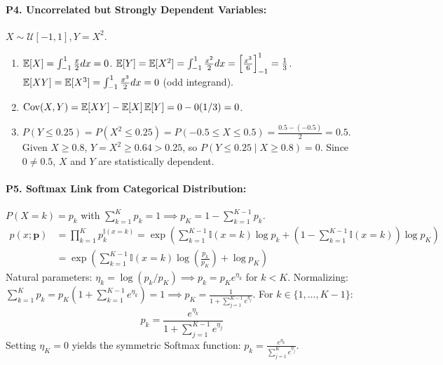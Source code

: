 \paragraph{P4. Uncorrelated but Strongly Dependent Variables:}
$X \sim \mathcal{U}[-1, 1], Y = X^2$.
\begin{enumerate}[label=(\alph*)]
    \item $\operatorname{\mathbb{E}}[X] = \int_{-1}^1 \frac{x}{2}dx = 0$.
    $\operatorname{\mathbb{E}}[Y] = \operatorname{\mathbb{E}}[X^2] = \int_{-1}^1 \frac{x^2}{2}dx = \left[\frac{x^3}{6}\right]_{-1}^1 = \frac{1}{3}$.
    $\operatorname{\mathbb{E}}[XY] = \operatorname{\mathbb{E}}[X^3] = \int_{-1}^1 \frac{x^3}{2}dx = 0$ (odd integrand).
    \item $\operatorname{Cov}(X, Y) = \operatorname{\mathbb{E}}[XY] - \operatorname{\mathbb{E}}[X]\operatorname{\mathbb{E}}[Y] = 0 - 0(1/3) = 0$.
    \item $P(Y \le 0.25) = P(X^2 \le 0.25) = P(-0.5 \le X \le 0.5) = \frac{0.5 - (-0.5)}{2} = 0.5$.
    Given $X \ge 0.8$, $Y = X^2 \ge 0.64 > 0.25$, so $P(Y \le 0.25 \mid X \ge 0.8) = 0$.
    Since $0 \ne 0.5$, $X$ and $Y$ are statistically dependent.
\end{enumerate}

\paragraph{P5. Softmax Link from Categorical Distribution:}
$P(X = k) = p_k$ with $\sum_{k=1}^K p_k = 1 \implies p_K = 1 - \sum_{k=1}^{K-1} p_k$.
\begin{align*}
p(x; \mathbf{p}) &= \prod_{k=1}^K p_k^{\mathbb{I}(x = k)} = \exp\left( \sum_{k=1}^{K-1} \mathbb{I}(x=k)\log p_k + \left(1 - \sum_{k=1}^{K-1}\mathbb{I}(x=k)\right)\log p_K \right) \\
&= \exp\left( \sum_{k=1}^{K-1} \mathbb{I}(x=k)\log\left(\frac{p_k}{p_K}\right) + \log p_K \right)
\end{align*}
Natural parameters: $\eta_k = \log(p_k / p_K) \implies p_k = p_K e^{\eta_k}$ for $k < K$.
Normalizing: $\sum_{k=1}^K p_k = p_K \left(1 + \sum_{k=1}^{K-1} e^{\eta_k}\right) = 1 \implies p_K = \frac{1}{1 + \sum_{j=1}^{K-1} e^{\eta_j}}$.
For $k \in \{1, \dots, K-1\}$:
\begin{equation*}
p_k = \frac{e^{\eta_k}}{1 + \sum_{j=1}^{K-1} e^{\eta_j}}
\end{equation*}
Setting $\eta_K = 0$ yields the symmetric Softmax function: $p_k = \frac{e^{\eta_k}}{\sum_{j=1}^K e^{\eta_j}}$.

